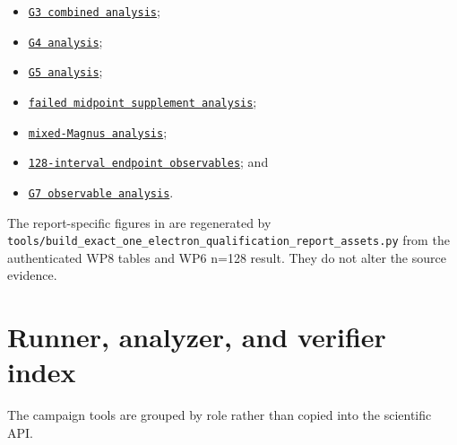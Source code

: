 \documentclass[11pt]{article}
\newcommand{\filelink}[2]{\href{run:#2}{\texttt{#1}}}
\begin{document}
\begin{itemize}
  \item \filelink{G3 combined analysis}{/home/cgs/00_WORK/Projection_Code/CALCULATIONS/campaigns/exact_one_electron_qualification/wp3_pair_distance_20260917T002456Z_3fd2a83b77d1/g3_analysis};
  \item \filelink{G4 analysis}{/home/cgs/00_WORK/Projection_Code/CALCULATIONS/campaigns/exact_one_electron_qualification/wp4_first_order_20260918T191425Z_3fd2a83b77d1/analysis};
  \item \filelink{G5 analysis}{/home/cgs/00_WORK/Projection_Code/CALCULATIONS/campaigns/exact_one_electron_qualification/wp5_multicentre_20260918T200808Z_3fd2a83b77d1/analysis};
  \item \filelink{failed midpoint supplement analysis}{/home/cgs/00_WORK/Projection_Code/CALCULATIONS/campaigns/exact_one_electron_qualification/wp6_h3_timestep_refinement_20260918T212428Z_3fd2a83b77d1/analysis};
  \item \filelink{mixed-Magnus analysis}{/home/cgs/00_WORK/Projection_Code/CALCULATIONS/campaigns/exact_one_electron_qualification/wp6_mixed_magnus_20260918T231057Z_38ce83eb2fe9/analysis};
  \item \filelink{128-interval endpoint observables}{/home/cgs/00_WORK/Projection_Code/CALCULATIONS/campaigns/exact_one_electron_qualification/wp6_mixed_magnus_n128_diagnostics_20260919T124656Z_73f6dc1cb760/endpoint_observables}; and
  \item \filelink{G7 observable analysis}{/home/cgs/00_WORK/Projection_Code/CALCULATIONS/campaigns/exact_one_electron_qualification/wp7_observables_cpu_20260919T145221Z_7d603105e1db/analysis}.
\end{itemize}

The report-specific figures in
 are regenerated by
\texttt{tools/build\_exact\_one\_electron\_qualification\_report\_assets.py}
from the authenticated WP8 tables and WP6 n=128 result.  They do not alter the
source evidence.

\section{Runner, analyzer, and verifier index}\label{sec:tool-index}

The campaign tools are grouped by role rather than copied into the scientific
API.
\end{document}
